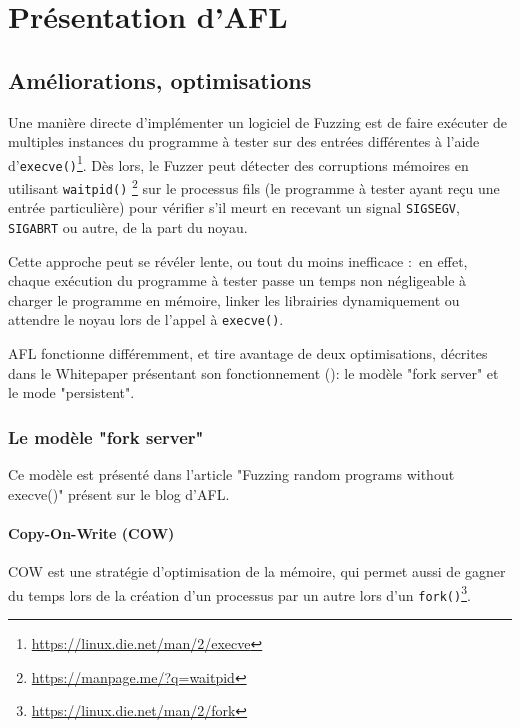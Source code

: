 \chapter{Présentation d'AFL}

\section{Améliorations, optimisations}

Une manière directe d'implémenter un logiciel de Fuzzing est de faire exécuter de multiples instances du programme à tester sur des entrées différentes à l'aide d'\lstinline{execve()}\footnote{\url{https://linux.die.net/man/2/execve}}.
Dès lors, le Fuzzer peut détecter des corruptions mémoires en utilisant \lstinline{waitpid()} \footnote{\url{https://manpage.me/?q=waitpid}} sur le processus fils (le programme à tester ayant reçu une entrée particulière) pour vérifier s'il meurt en recevant un signal \lstinline{SIGSEGV}, \lstinline{SIGABRT} ou autre, de la part du noyau.

Cette approche peut se révéler lente, ou tout du moins inefficace : en effet, chaque exécution du programme à tester passe un temps non négligeable à charger le programme en mémoire, linker les librairies dynamiquement ou attendre le noyau lors de l'appel à \lstinline{execve()}.

AFL fonctionne différemment, et tire avantage de deux optimisations, décrites dans le Whitepaper présentant son fonctionnement (\cite[section 10 : The fork server]{technical-details}): le modèle "fork server" et le mode "persistent".


\subsection{Le modèle "fork server"}

Ce modèle est présenté dans l'article "Fuzzing random programs without execve()"\cite{fuzzing-binaries-without-execve} présent sur le blog d'AFL.

\subsubsection{Copy-On-Write (COW)}

COW est une stratégie d'optimisation de la mémoire, qui permet aussi de gagner du temps lors de la création d'un processus par un autre lors d'un \lstinline{fork()}\footnote{\url{https://linux.die.net/man/2/fork}}.

